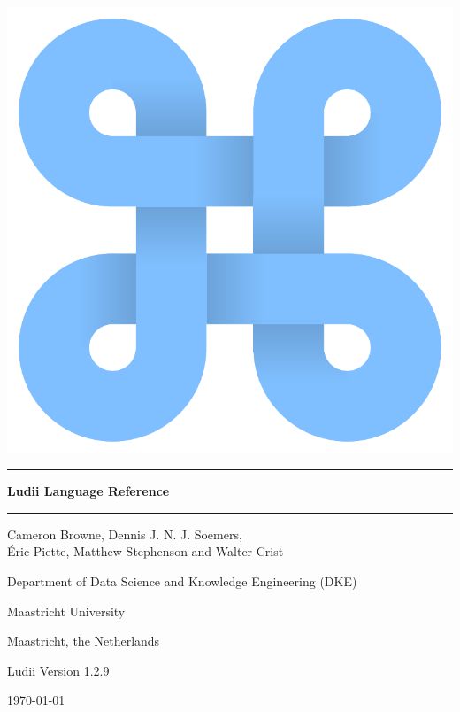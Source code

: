 \documentclass[10pt,twoside]{report}
\begin{document}
\texttt{\hyphenchar{} }

\thispagestyle{empty}

\begin{centering}

\includegraphics[scale=0.35]{figs/ludii-icon-1.pdf}


\vspace{30mm}
\noindent\rule{14.5cm}{0.5pt}

\vspace{5mm}
{\Huge \bf Ludii Language Reference}

\vspace{2mm}
\noindent\rule{14.5cm}{0.5pt}
 
 
\vspace{10mm}
{\Large Cameron Browne, Dennis J. N. J. Soemers,\\ {\'E}ric Piette, Matthew Stephenson and Walter Crist}

\vspace{10mm}
{\large Department of Data Science and Knowledge Engineering (DKE)}
 
\vspace{1mm}
{\large Maastricht University}

\vspace{1mm}
{\large Maastricht, the Netherlands}

\vspace{10mm}
{\large Ludii Version 1.2.9}

\vspace{1mm}
{\large \today}

\pagebreak

\end{centering}
\end{document}

